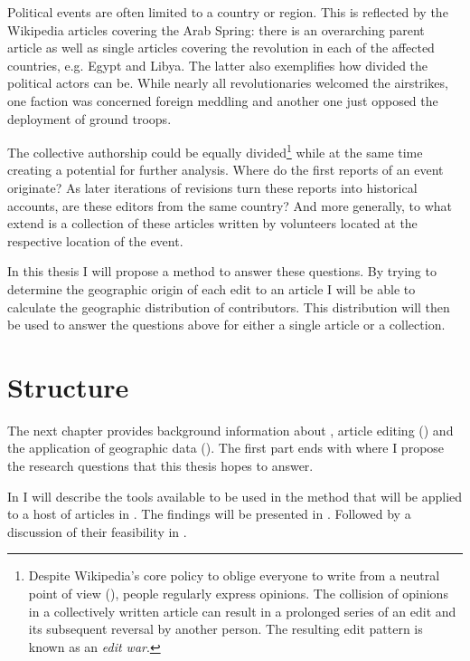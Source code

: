 Political events are often limited to a country or region. 
This is reflected by the Wikipedia articles covering the Arab Spring: there is an overarching parent article as well as single articles covering the revolution in each of the affected countries, e.g. Egypt and Libya.
The latter also exemplifies how divided the political actors can be.
While nearly all revolutionaries welcomed the airstrikes, one faction was concerned foreign meddling and another one just opposed the deployment of ground troops.\cite{econ18290470}

The collective authorship could be equally divided\footnote{Despite Wikipedia's core policy to oblige everyone to write from a neutral point of view (), people regularly express opinions. The collision of opinions in a collectively written article can result in a prolonged series of an edit and its subsequent reversal by another person. The resulting edit pattern is known as an \emph{edit war}.\cite{suh2007us}} while at the same time creating a potential for further analysis.
Where do the first reports of an event originate?
As later iterations of revisions turn these reports into historical accounts, are these editors from the same country?
And more generally, to what extend is a collection of these articles written by volunteers located at the respective location of the event.

In this thesis I will propose a method to answer these questions.
By trying to determine the geographic origin of each edit to an article I will be able to calculate the geographic distribution of contributors.
This distribution will then be used to answer the questions above for either a single article or a collection.


\section{Structure}


The next chapter  provides background information about , article editing () and the application of geographic data ().
The first part ends with  where I propose the research questions that this thesis hopes to answer.

In  I will describe the tools available to be used in the method that will be applied to a host of articles in .
The findings will be presented in .
Followed by a discussion of their feasibility in .